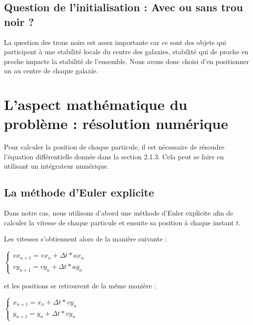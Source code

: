 \vspace{3mm}
\subsection{Question de l'initialisation : Avec ou sans trou noir ?}
\vspace{2mm}

La question des trous noirs est assez importante car ce sont des objets qui participent à une stabilité locale du centre des galaxies, stabilité qui de proche en proche impacte la stabilité de l'ensemble. Nous avons donc choisi d'en positionner un au centre de chaque galaxie.

\section{L'aspect mathématique du problème : résolution numérique}

Pour calculer la position de chaque particule, il est nécessaire de résoudre l'équation différentielle donnée dans la section 2.1.3. Cela peut se faire en utilisant un intégrateur numérique.

\subsection{La méthode d'Euler explicite}

Dans notre cas, nous utilisons d'abord une méthode d'Euler explicite afin de calculer la vitesse de chaque particule et ensuite sa position à chaque instant $t$.

\vspace{2mm}
Les vitesses s'obtiennent alors de la manière suivante :
\vspace{2mm}

$
\left\{
    \begin{array}{ll}
        vx_{n+1} =vx_{n} + \Delta t *ax_{n} \\
        vy_{n+1} =vy_{n} + \Delta t *ay_{n}
    \end{array}
\right.
$

\vspace{2mm}
et les positions se retrouvent de la même manière :
\vspace{2mm}

$
\left\{
    \begin{array}{ll}
        x_{n+1} =x_{n} + \Delta t *vy_{n} \\
        y_{n+1} =y_{n} + \Delta t *vy_{n}
    \end{array}
\right.
$

